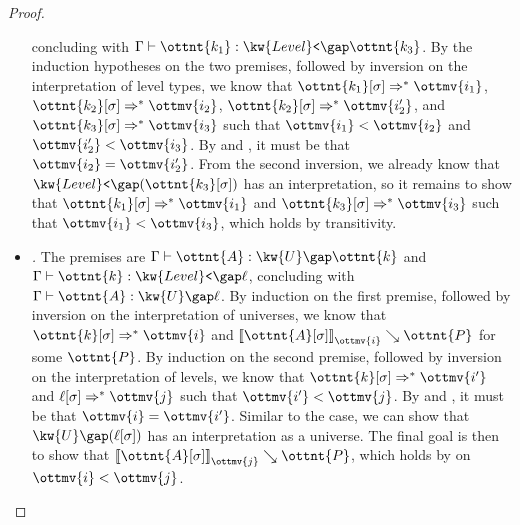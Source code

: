 \documentclass[a4paper,UKenglish,cleveref,autoref,thm-restate]{lipics-v2021}
\begin{document}
\begin{proof}
\begin{itemize}
      concluding with $ \Gamma  \vdash  \ottnt{k_{{\mathrm{1}}}}  \mathrel{:}   \kw{Level}\texttt{<} \gap  \ottnt{k_{{\mathrm{3}}}}  $.
      By the induction hypotheses on the two premises,
      followed by inversion on the interpretation of level types,
      we know that $  \ottnt{k_{{\mathrm{1}}}} [  \sigma  ]   \Rightarrow^\ast   \ottmv{i_{{\mathrm{1}}}}  $, $  \ottnt{k_{{\mathrm{2}}}} [  \sigma  ]   \Rightarrow^\ast   \ottmv{i_{{\mathrm{2}}}}  $, $  \ottnt{k_{{\mathrm{2}}}} [  \sigma  ]   \Rightarrow^\ast   \ottmv{i'_{{\mathrm{2}}}}  $, and $  \ottnt{k_{{\mathrm{3}}}} [  \sigma  ]   \Rightarrow^\ast   \ottmv{i_{{\mathrm{3}}}}  $
      such that $ \ottmv{i_{{\mathrm{1}}}}  <  \ottmv{i_{{\mathrm{2}}}} $ and $ \ottmv{i'_{{\mathrm{2}}}}  <  \ottmv{i_{{\mathrm{3}}}} $.
      By  and ,
      it must be that $\ottmv{i_{{\mathrm{2}}}} = \ottmv{i'_{{\mathrm{2}}}}$.
      From the second inversion, we already know that $ \kw{Level}\texttt{<} \gap   (  \ottnt{k_{{\mathrm{3}}}} [  \sigma  ]  )  $ has an interpretation,
      so it remains to show that $  \ottnt{k_{{\mathrm{1}}}} [  \sigma  ]   \Rightarrow^\ast   \ottmv{i_{{\mathrm{1}}}}  $ and $  \ottnt{k_{{\mathrm{3}}}} [  \sigma  ]   \Rightarrow^\ast   \ottmv{i_{{\mathrm{3}}}}  $ such that $ \ottmv{i_{{\mathrm{1}}}}  <  \ottmv{i_{{\mathrm{3}}}} $,
      which holds by transitivity.
    \item \textit{.}
      The premises are $ \Gamma  \vdash  \ottnt{A}  \mathrel{:}   \kw{U} \gap  \ottnt{k}  $ and $ \Gamma  \vdash  \ottnt{k}  \mathrel{:}   \kw{Level}\texttt{<} \gap  \ell  $,
      concluding with $ \Gamma  \vdash  \ottnt{A}  \mathrel{:}   \kw{U} \gap  \ell  $.
      By induction on the first premise,
      followed by inversion on the interpretation of universes,
      we know that $  \ottnt{k} [  \sigma  ]   \Rightarrow^\ast   \ottmv{i}  $ and $ \mathopen{\llbracket}   \ottnt{A} [  \sigma  ]   \mathclose{\rrbracket}_{ \ottmv{i} } \searrow  \ottnt{P} $ for some $\ottnt{P}$.
      By induction on the second premise,
      followed by inversion on the interpretation of levels,
      we know that $  \ottnt{k} [  \sigma  ]   \Rightarrow^\ast   \ottmv{i'}  $ and $  \ell [  \sigma  ]   \Rightarrow^\ast   \ottmv{j}  $ such that $ \ottmv{i'}  <  \ottmv{j} $.
      By  and ,
      it must be that $\ottmv{i} = \ottmv{i'}$.
      Similar to the  case,
      we can show that $ \kw{U} \gap   (  \ell [  \sigma  ]  )  $ has an interpretation as a universe.
      The final goal is then to show that $ \mathopen{\llbracket}   \ottnt{A} [  \sigma  ]   \mathclose{\rrbracket}_{ \ottmv{j} } \searrow  \ottnt{P} $,
      which holds by  on $ \ottmv{i}  <  \ottmv{j} $.
      \qedhere
  \end{itemize}
\end{proof}
\end{document}
